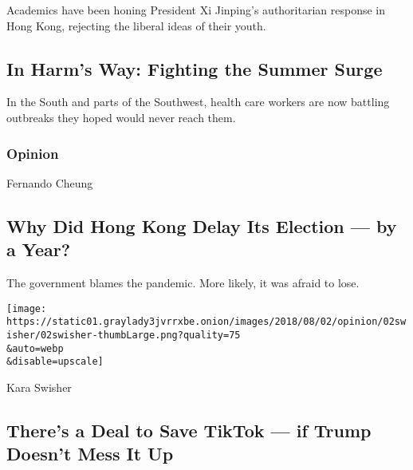 \href{/2020/08/02/world/asia/china-hong-kong-national-security-law.html}{}

Academics have been honing President Xi Jinping's authoritarian response
in Hong Kong, rejecting the liberal ideas of their youth.

\href{/interactive/2020/world/coronavirus-health-care-workers.html}{}

\hypertarget{in-harms-way-fighting-the-summer-surge}{%
\subsection{In Harm's Way: Fighting the Summer
Surge}\label{in-harms-way-fighting-the-summer-surge}}

In the South and parts of the Southwest, health care workers are now
battling outbreaks they hoped would never reach them.

\href{https://www.nytimes3xbfgragh.onion/section/opinion?pagetype=Homepage\&action=click\&module=Opinion}{}

\hypertarget{opinion}{%
\subsubsection{Opinion}\label{opinion}}

\href{/2020/08/02/opinion/hong-kong-election-china.html}{}

Fernando Cheung

\hypertarget{why-did-hong-kong-delay-its-election--by-a-year}{%
\subsection{Why Did Hong Kong Delay Its Election --- by a
Year?}\label{why-did-hong-kong-delay-its-election--by-a-year}}

The government blames the pandemic. More likely, it was afraid to lose.

\href{/2020/08/02/opinion/02tik-tok-china-trump.html}{}

\texttt{[image: https://static01.graylady3jvrrxbe.onion/images/2018/08/02/opinion/02swisher/02swisher-thumbLarge.png?quality=75\\\&auto=webp\\\&disable=upscale]}

Kara Swisher

\hypertarget{theres-a-deal-to-save-tiktok--if-trump-doesnt-mess-it-up}{%
\subsection{There's a Deal to Save TikTok --- if Trump Doesn't Mess It
Up}\label{theres-a-deal-to-save-tiktok--if-trump-doesnt-mess-it-up}}

